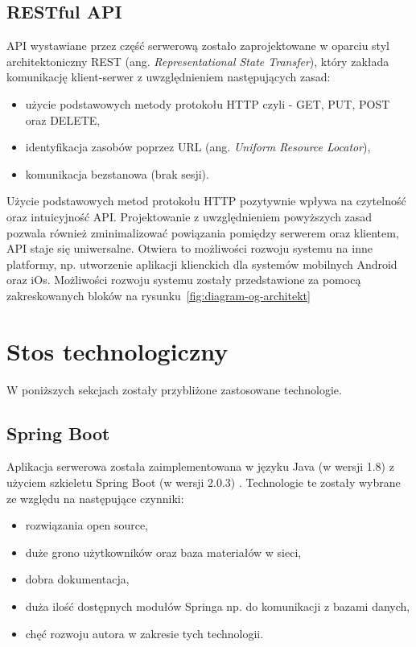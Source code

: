 \subsection{RESTful API}
API wystawiane przez część serwerową zostało zaprojektowane w oparciu styl architektoniczny REST (ang. \textit{Representational State Transfer}), który zakłada komunikację klient-serwer z uwzględnieniem następujących zasad: 
\begin{itemize}
\item użycie podstawowych metody protokołu HTTP czyli - GET, PUT, POST oraz DELETE,
\item identyfikacja zasobów poprzez URL (ang. \textit{Uniform Resource Locator}),
\item komunikacja bezstanowa (brak sesji).
\end{itemize}

Użycie podstawowych metod protokołu HTTP pozytywnie wpływa na czytelność oraz intuicyjność API. Projektowanie z uwzględnieniem powyższych zasad pozwala również zminimalizować powiązania pomiędzy serwerem oraz klientem, API staje się uniwersalne. Otwiera to możliwości rozwoju systemu na inne platformy, np. utworzenie aplikacji klienckich dla systemów mobilnych Android oraz iOs. Możliwości rozwoju systemu zostały przedstawione za pomocą zakreskowanych bloków na rysunku~\ref{fig:diagram-og-architekt}

\section{Stos technologiczny}

W poniższych sekcjach zostały przybliżone zastosowane technologie. 

\subsection{Spring Boot}

Aplikacja serwerowa została zaimplementowana w języku Java (w wersji 1.8) \cite{java} z użyciem szkieletu Spring Boot (w wersji 2.0.3) \cite{springboot}. Technologie te zostały wybrane ze względu na następujące czynniki:
 \begin{itemize}
\item rozwiązania open source,
\item duże grono użytkowników oraz baza materiałów w sieci,
\item dobra dokumentacja,
\item duża ilość dostępnych modułów Springa np. do komunikacji z bazami danych,
\item chęć rozwoju autora w zakresie tych technologii.
\end{itemize}


